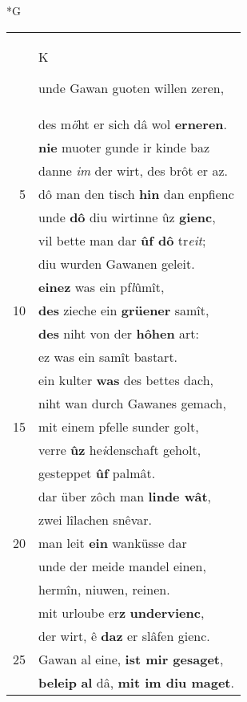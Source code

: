 \documentclass[8pt,a4paper,notitlepage]{article}
\begin{document}
\begin{table}[ht]
\begin{minipage}[t]{0.5\linewidth}
\small
\begin{center}*G
\end{center}
\begin{tabular}{rl}
 & \begin{large}K\end{large}unde Gawan guoten willen zeren,\\ 
 & des m\textit{ö}ht er sich dâ wol \textbf{erneren}.\\ 
 & \textbf{nie} muoter gunde ir kinde baz\\ 
 & danne \textit{im} der wirt, des brôt er az.\\ 
5 & dô man den tisch \textbf{hin} dan enpfienc\\ 
 & unde \textbf{dô} diu wirtinne ûz \textbf{gienc},\\ 
 & vil bette man dar \textbf{ûf dô} tr\textit{eit};\\ 
 & diu wurden Gawanen geleit.\\ 
 & \textbf{einez} was ein pf\textit{l}ûmît,\\ 
10 & \textbf{des} zieche ein \textbf{grüener} samît,\\ 
 & \textbf{des} niht von der \textbf{hôhen} art:\\ 
 & ez was ein samît bastart.\\ 
 & ein kulter \textbf{was} des bettes dach,\\ 
 & niht wan durch Gawanes gemach,\\ 
15 & mit einem pfelle sunder golt,\\ 
 & verre \textbf{ûz} he\textit{i}denschaft geholt,\\ 
 & gesteppet \textbf{ûf} palmât.\\ 
 & dar über zôch man \textbf{linde wât},\\ 
 & zwei lîlachen snêvar.\\ 
20 & man leit \textbf{ein} wanküsse dar\\ 
 & unde der meide mandel einen,\\ 
 & hermîn, niuwen, reinen.\\ 
 & mit urloube er\textbf{z} \textbf{undervienc},\\ 
 & der wirt, ê \textbf{daz} er slâfen gienc.\\ 
25 & Gawan al eine, \textbf{ist mir gesaget},\\ 
 & \textbf{beleip} \textbf{al} dâ, \textbf{mit im diu maget}.\\ 

\end{tabular}
\end{minipage}
\end{table}
\end{document}
